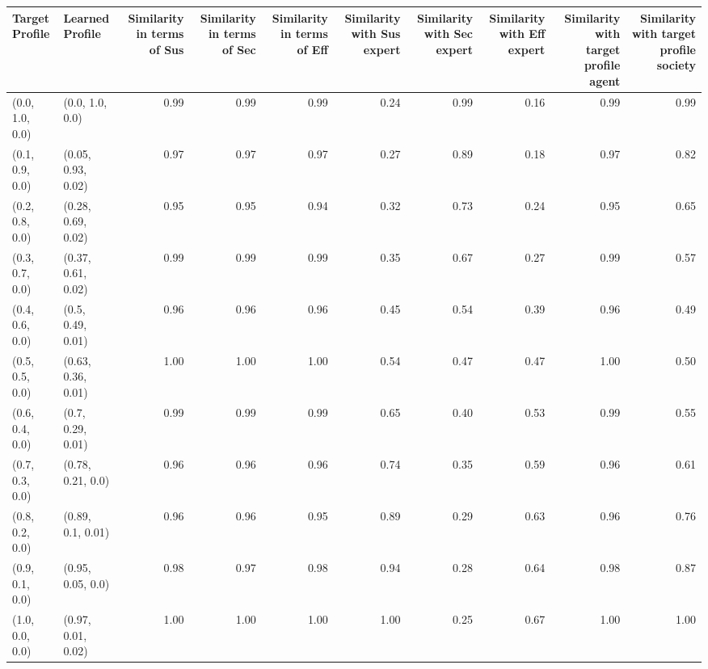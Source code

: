 \begin{tabular}{llrrrrrrrr}
\toprule
Target Profile & Learned Profile & Similarity in terms of Sus & Similarity in terms of Sec & Similarity in terms of Eff & Similarity with Sus expert & Similarity with Sec expert & Similarity with Eff expert & Similarity with target profile agent & Similarity with target profile society \\
\midrule
(0.0, 1.0, 0.0) & (0.0, 1.0, 0.0) & 0.99 & 0.99 & 0.99 & 0.24 & 0.99 & 0.16 & 0.99 & 0.99 \\
(0.1, 0.9, 0.0) & (0.05, 0.93, 0.02) & 0.97 & 0.97 & 0.97 & 0.27 & 0.89 & 0.18 & 0.97 & 0.82 \\
(0.2, 0.8, 0.0) & (0.28, 0.69, 0.02) & 0.95 & 0.95 & 0.94 & 0.32 & 0.73 & 0.24 & 0.95 & 0.65 \\
(0.3, 0.7, 0.0) & (0.37, 0.61, 0.02) & 0.99 & 0.99 & 0.99 & 0.35 & 0.67 & 0.27 & 0.99 & 0.57 \\
(0.4, 0.6, 0.0) & (0.5, 0.49, 0.01) & 0.96 & 0.96 & 0.96 & 0.45 & 0.54 & 0.39 & 0.96 & 0.49 \\
(0.5, 0.5, 0.0) & (0.63, 0.36, 0.01) & 1.00 & 1.00 & 1.00 & 0.54 & 0.47 & 0.47 & 1.00 & 0.50 \\
(0.6, 0.4, 0.0) & (0.7, 0.29, 0.01) & 0.99 & 0.99 & 0.99 & 0.65 & 0.40 & 0.53 & 0.99 & 0.55 \\
(0.7, 0.3, 0.0) & (0.78, 0.21, 0.0) & 0.96 & 0.96 & 0.96 & 0.74 & 0.35 & 0.59 & 0.96 & 0.61 \\
(0.8, 0.2, 0.0) & (0.89, 0.1, 0.01) & 0.96 & 0.96 & 0.95 & 0.89 & 0.29 & 0.63 & 0.96 & 0.76 \\
(0.9, 0.1, 0.0) & (0.95, 0.05, 0.0) & 0.98 & 0.97 & 0.98 & 0.94 & 0.28 & 0.64 & 0.98 & 0.87 \\
(1.0, 0.0, 0.0) & (0.97, 0.01, 0.02) & 1.00 & 1.00 & 1.00 & 1.00 & 0.25 & 0.67 & 1.00 & 1.00 \\
\bottomrule
\end{tabular}
